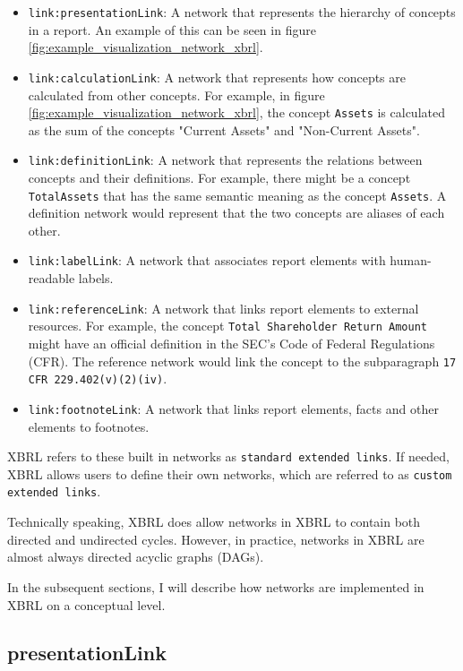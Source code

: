 \begin{itemize}
    \item \texttt{link:presentationLink}: A network that represents the hierarchy of concepts in a report. An example of this can be seen in figure \ref{fig:example_visualization_network_xbrl}.
    \item \texttt{link:calculationLink}: A network that represents how concepts are calculated from other concepts. 
    For example, in figure \ref{fig:example_visualization_network_xbrl}, the concept \texttt{Assets} is calculated as the sum of the concepts "Current Assets" and "Non-Current Assets".
    \item \texttt{link:definitionLink}: A network that represents the relations between concepts and their definitions. 
    For example, there might be a concept \texttt{TotalAssets} that has the same semantic meaning as the concept \texttt{Assets}. 
    A definition network would represent that the two concepts are aliases of each other.
    \item \texttt{link:labelLink}: A network that associates report elements with human-readable labels.
    \item \texttt{link:referenceLink}: A network that links report elements to external resources. 
    For example, the concept \texttt{Total Shareholder Return Amount} might have an official definition in the SEC's Code of Federal Regulations (CFR).
    The reference network would link the concept to the subparagraph \texttt{17 CFR 229.402(v)(2)(iv)}\cite{cfr_total_shareholder_return_amount}.
    \item \texttt{link:footnoteLink}: A network that links report elements, facts and other elements to footnotes.
\end{itemize}

XBRL refers to these built in networks as \texttt{standard extended links}. 
If needed, XBRL allows users to define their own networks, which are referred to as \texttt{custom extended links}\cite{xbrl21_terminology}.

Technically speaking, XBRL does allow networks in XBRL to contain both directed and undirected cycles.
However, in practice, networks in XBRL are almost always directed acyclic graphs (DAGs).

In the subsequent sections, I will describe how networks are implemented in XBRL on a conceptual level. 

\subsection{presentationLink}

